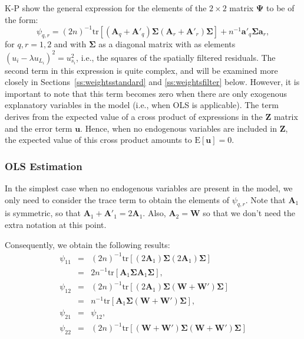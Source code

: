 \documentclass{article}
\begin{document}
K-P show the general expression for the elements of the $2 \times 2$ matrix $\mathbf{\Psi}$ to
be of the form:
\begin{equation}\label{eq:psiqr}
\psi_{q,r} = (2n)^{-1} \mbox{tr} [ (\mathbf{A}_q + \mathbf{A'}_q ) \mathbf{\mathbf{\Sigma}}  (\mathbf{A}_r + \mathbf{A'}_r ) \mathbf{\Sigma} ] + n^{-1} \mathbf{a'}_q \mathbf{\Sigma} \mathbf{a}_r,
\end{equation}
for $q, r = 1,2$ and with $\mathbf{\Sigma}$ as a diagonal matrix with as elements 
$(u_i - \lambda u_{L_i})^2 = u_{s_i}^2$, i.e., the squares of the spatially filtered residuals.
The second term in this expression is quite complex, and will be examined more closely 
in Sections~\ref{ss:weightsstandard} and \ref{ss:weightsfilter} below.
However, it is important to note that this term becomes zero when there are only exogenous
explanatory variables in the model (i.e., when OLS is applicable). The term derives from the
expected value of a cross
product of expressions in the $\mathbf{Z}$ matrix and the error term $\mathbf{u}$. Hence,
when no endogenous variables are included in $\mathbf{Z}$, the expected value of this
cross product amounts to $\mbox{E}[ \mathbf{u} ] = 0$.

\subsubsection{OLS Estimation}
In the simplest case when no endogenous variables are present in the model, we
only need to consider the trace term to obtain the elements of $\psi_{q,r}$. Note that 
$\mathbf{A}_1$ is symmetric, so that $\mathbf{A}_1 + \mathbf{A'}_1 = 2 \mathbf{A}_1$.
Also, $\mathbf{A}_2 = \mathbf{W}$ so that we don't need the extra notation at this
point.

Consequently, we obtain the following results:
\begin{eqnarray*}
 \psi_{11} &=& (2n)^{-1} \mbox{tr} [ (2 \mathbf{A}_1 ) \mathbf{\Sigma}  (2 \mathbf{A}_1 ) \mathbf{\Sigma} ]\\
        &=&  2 n^{-1} \mbox{tr} [ \mathbf{A}_1 \mathbf{\Sigma} \mathbf{A}_1 \mathbf{\Sigma} ],\\
  \psi_{12} &=& (2n)^{-1} \mbox{tr} [ (2 \mathbf{A}_1 ) \mathbf{\Sigma} (\mathbf{W} + \mathbf{W'} ) \mathbf{\Sigma} ]\\
       &=& n^{-1} \mbox{tr} [  \mathbf{A}_1 \mathbf{\Sigma} (\mathbf{W} + \mathbf{W'} ) \mathbf{\Sigma} ],\\
   \psi_{21} &=& \psi_{12},\\
   \psi_{22} &=& (2n)^{-1} \mbox{tr} [ (\mathbf{W} + \mathbf{W'}) \mathbf{\Sigma} 
   (\mathbf{W} + \mathbf{W'})\mathbf{\Sigma} ]
\end{eqnarray*}
\end{document}
